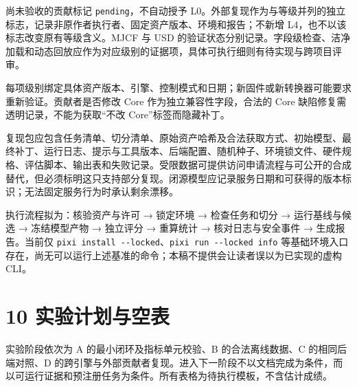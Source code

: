 \documentclass[
  chinese,
  11pt,
  a4paper,
  fontset=fandol]{ctexart}
\begin{document}
尚未验收的贡献标记 \texttt{pending}，不自动授予
L0。外部复现作为与等级并列的独立标志，记录非原作者执行者、固定资产版本、环境和报告；不新增
L4，也不以该标志改变原有等级含义。MJCF 与 USD
的验证状态分别记录。字段级检查、洁净加载和动态回放应作为对应级别的证据项，具体可执行细则有待实现与跨项目评审。

每项级别绑定具体资产版本、引擎、控制模式和日期；新固件或新转换器可能要求重新验证。贡献者是否修改
Core 作为独立兼容性字段，合法的 Core
缺陷修复需透明记录，不能为获取``不改 Core''标签而隐藏补丁。

复现包应包含任务清单、切分清单、原始资产哈希及合法获取方式、初始模型、最终补丁、运行日志、提示与工具版本、后端配置、随机种子、环境锁文件、硬件规格、评估脚本、输出表和失败记录。受限数据可提供访问申请流程与可公开的合成替代，但必须标明这只支持部分复现。闭源模型应记录服务日期和可获得的版本标识；无法固定服务行为时承认剩余漂移。

执行流程拟为：核验资产与许可 → 锁定环境 → 检查任务和切分 →
运行基线与候选 → 冻结模型产物 → 独立评分 → 重算统计 → 核对日志与安全事件
→ 生成报告。当前仅
\texttt{pixi\ install\ -\/-locked}、\texttt{pixi\ run\ -\/-locked\ info}
等基础环境入口存在，尚无可以运行上述基准的命令；本稿不提供会让读者误以为已实现的虚构
CLI。

\section{10
实验计划与空表}\label{ux5b9eux9a8cux8ba1ux5212ux4e0eux7a7aux8868}

实验阶段依次为 A 的最小闭环及指标单元校验、B 的合法离线数据、C
的相同后端对照、D
的跨引擎与外部贡献者复现。进入下一阶段不以文档完成为条件，而以可运行证据和预注册任务为条件。所有表格为待执行模板，不含估计成绩。
\end{document}
